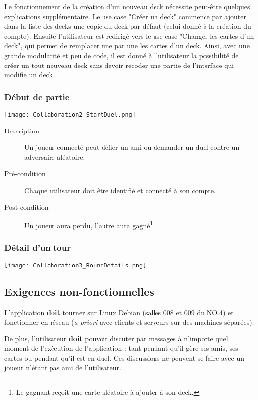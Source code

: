 \documentclass{article}
\begin{document}
			Le fonctionnement de la création d'un nouveau deck nécessite peut-être quelques explications
			supplémentaire. 
			Le use case "Créer un deck" commence par ajouter dans la liste des decks
			une copie du deck par défaut (celui donné à la création du compte). Ensuite l'utilisateur
			est redirigé vers le use case "Changer les cartes d'un deck", qui permet de remplacer
			une par une les cartes d'un deck. 
			Ainsi, avec une grande modularité et peu de code,
			il est donné à l'utilisateur la possibilité de créer un tout nouveau deck sans devoir recoder une partie
			de l'interface qui modifie un deck.

		\subsubsection{Début de partie}
			\begin{center}\texttt{[image: Collaboration2\_StartDuel.png]}\end{center}

			\begin{description}
				\item[Description] Un joueur connecté peut défier un ami ou demander un duel contre un adversaire aléatoire.
				\item[Pré-condition] Chaque utilisateur doit être identifié et connecté à son compte.
				\item[Post-condition] Un joueur aura perdu, l'autre aura gagné\footnote{Le gagnant reçoit une carte aléatoire à ajouter à son deck.}
			\end{description}

		\subsubsection{Détail d'un tour}
			\begin{center}\texttt{[image: Collaboration3\_RoundDetails.png]}\end{center}

	\subsection{Exigences non-fonctionnelles}
		L'application \textbf{doit} tourner sur Linux Debian (salles 008 et 009 du NO.4) et fonctionner en réseau (\textit{a priori} avec clients
		et serveurs sur des machines séparées).

		De plus, l'utilisateur \textbf{doit} pouvoir discuter par messages à n'importe quel moment de l'exécution de l'application : tant pendant
		qu'il gère ses amis, ses cartes ou pendant qu'il est en duel. Ces discussions ne peuvent se faire avec un joueur
		n'étant pas ami de l'utilisateur.
\end{document}
